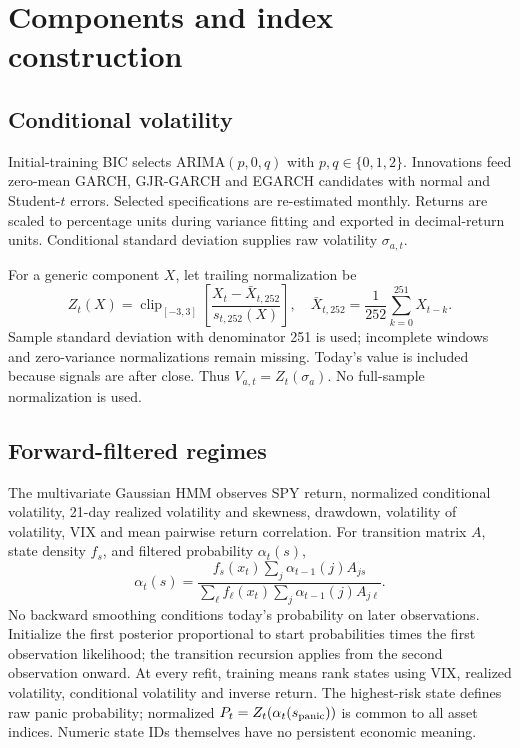 \documentclass[11pt]{article}
\begin{document}
\section{Components and index construction}
\subsection{Conditional volatility}
Initial-training BIC selects ARIMA$(p,0,q)$ with $p,q\in\{0,1,2\}$. Innovations feed zero-mean
GARCH, GJR-GARCH and EGARCH candidates with normal and Student-$t$ errors. Selected specifications
are re-estimated monthly. Returns are scaled to percentage units during variance fitting and exported
in decimal-return units. Conditional standard deviation supplies raw volatility $\sigma_{a,t}$.

For a generic component $X$, let trailing normalization be
\begin{equation}
Z_t(X)=\operatorname{clip}_{[-3,3]}
\left[\frac{X_t-\bar X_{t,252}}{s_{t,252}(X)}\right],
\quad \bar X_{t,252}=\frac1{252}\sum_{k=0}^{251}X_{t-k}.
\end{equation}
Sample standard deviation with denominator 251 is used; incomplete windows and zero-variance
normalizations remain missing. Today's value is included
because signals are after close. Thus $V_{a,t}=Z_t(\sigma_a)$. No full-sample normalization is used.

\subsection{Forward-filtered regimes}
The multivariate Gaussian HMM observes SPY return, normalized conditional volatility, 21-day realized
volatility and skewness, drawdown, volatility of volatility, VIX and mean pairwise return correlation.
For transition matrix $A$, state density $f_s$, and filtered probability $\alpha_t(s)$,
\begin{equation}
\alpha_t(s)=\frac{f_s(x_t)\sum_j\alpha_{t-1}(j)A_{js}}
{\sum_\ell f_\ell(x_t)\sum_j\alpha_{t-1}(j)A_{j\ell}}.
\end{equation}
No backward smoothing conditions today's probability on later observations. Initialize the first
posterior proportional to start probabilities times the first observation likelihood; the transition
recursion applies from the second observation onward. At every refit, training
means rank states using VIX, realized volatility, conditional volatility and inverse return. The
highest-risk state defines raw panic probability; normalized $P_t=Z_t(\alpha_t(s_{\rm panic}))$
is common to all asset indices. Numeric state IDs themselves have no persistent economic meaning.
\end{document}
